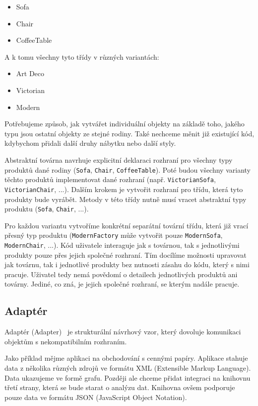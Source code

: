 \begin{itemize}
    \item Sofa
    \item Chair
    \item CoffeeTable
\end{itemize}

A k tomu všechny tyto třídy v různých variantách:

\begin{itemize}
    \item Art Deco
    \item Victorian
    \item Modern
\end{itemize}

Potřebujeme způsob, jak vytvářet individuální objekty na základě toho, jakého typu jsou ostatní objekty ze stejné rodiny. Také nechceme měnit již existující kód, kdybychom přidali další druhy nábytku nebo další styly.

Abstraktní továrna navrhuje explicitní deklaraci rozhraní pro všechny typy produktů dané rodiny (\texttt{Sofa}, \texttt{Chair}, \texttt{CoffeeTable}). Poté budou všechny varianty těchto produktů implementovat dané rozhraní (např. \texttt{VictorianSofa}, \texttt{VictorianChair}, ...). Dalším krokem je vytvořit rozhraní pro třídu, která tyto produkty bude vyrábět. Metody v této třídy nutně musí vracet abstraktní typy produktu (\texttt{Sofa}, \texttt{Chair}, ...).

Pro každou variantu vytvoříme konkrétní separátní tovární třídu, která již vrací přesný typ produktu (\texttt{ModernFactory} může vytvořit pouze \texttt{ModernSofa}, \texttt{ModernChair}, ...). Kód uživatele interaguje jak s továrnou, tak s jednotlivými produkty pouze přes jejich společné rozhraní. Tím docílíme možnosti upravovat jak továrnu, tak i jednotlivé produkty bez nutnosti zásahu do kódu, který s nimi pracuje. Uživatel tedy nemá povědomí o detailech jednotlivých produktů ani továrny. Jediné, co zná, je jejich společné rozhraní, se kterým nadále pracuje.

\subsection{Adaptér}
\label{adapter}

Adaptér (Adapter)~\cite{Adapter} je strukturální návrhový vzor, který dovoluje komunikaci objektům s nekompatibilním rozhraním.

Jako příklad mějme aplikaci na obchodování s cennými papíry. Aplikace stahuje data z několika různých zdrojů ve formátu XML (Extensible Markup Language). Data ukazujeme ve formě grafu. Později ale chceme přidat integraci na knihovnu třetí strany, která se bude starat o analýzu dat. Knihovna ovšem podporuje pouze data ve formátu JSON (JavaScript Object Notation).

